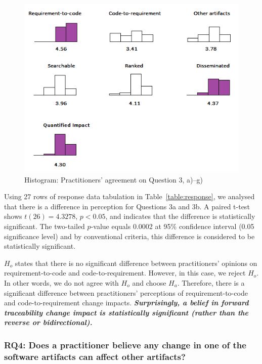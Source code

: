 \documentclass[conference]{IEEEtran}
\begin{document}
\begin{figure}
\includegraphics[width=\columnwidth]{pics/multihist.png}
\caption{Histogram: Practitioners' agreement on Question 3, a)--g)}
\label{histogram}
\end{figure}

Using 27 rows of response data tabulation in
Table~\ref{table:response}, we analysed that there is a difference in
perception for Questions 3a and 3b.  A paired t-test shows
$t(26) = 4.3278$, $p < 0.05$, and indicates that the difference is
statistically significant. The two-tailed $p$-value equals 0.0002 at
95\% confidence interval (0.05 significance level) and by conventional
criteria, this difference is considered to be statistically
significant.

$H_o$ states that there is no significant difference between
practitioners' opinions on requirement-to-code and
code-to-requirement. However, in this case, we reject $H_o$. In other
words, we do not agree with $H_o$ and choose $H_a$. Therefore, there
is a significant difference between practitioners' perceptions of
requirement-to-code and code-to-requirement change
impacts. \textbf{\textit{Surprisingly, a belief in forward
    traceability change impact is statistically significant (rather
    than the reverse or bidirectional).}}

\subsubsection{RQ4: Does a practitioner believe any change in one of
  the software artifacts can affect other artifacts?} 
\end{document}
